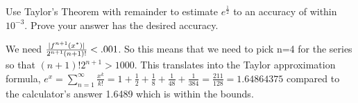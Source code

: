 \documentclass[12pt,letterpaper,boxed]{hmcpset}
\DeclarePairedDelimiter\abs{\lvert}{\rvert}%
\begin{document}
\begin{problem}[Exercise 1.17]
Use Taylor's Theorem with remainder to estimate $e^{\frac{1}{2}}$ to an accuracy of within $10^{-3}.$ Prove your answer has the desired accuracy.
\end{problem}

\begin{solution}
We need $\frac{\abs{f^{n+1}(x^{*})}}{2^{n + 1}(n + 1)!} < .001$. So this means that we need to pick n=4 for the series so that $(n + 1)!2^{n + 1} > 1000$. This translates into the Taylor approximation formula, $e^{x}=\sum_{n=1}^{\infty} \frac{x^{k}}{k!} = 1 + \frac{1}{2} + \frac{1}{8} + \frac{1}{48} + \frac{1}{384} = \frac{211}{128}=1.64864375$ compared to the calculator's answer 1.6489 which is within the bounds.
\end{solution}
\end{document}
